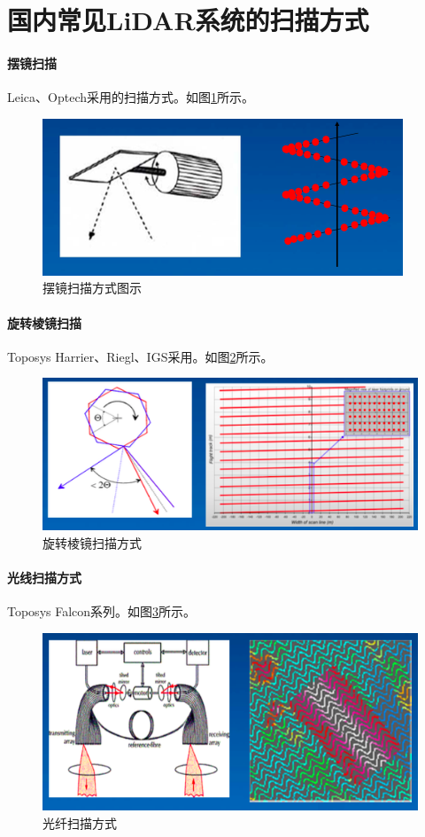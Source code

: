 \section{国内常见LiDAR系统的扫描方式}
\paragraph{摆镜扫描}Leica、Optech采用的扫描方式。如图\ref{fig:摆镜扫描方式}所示。
\begin{figure}[htbp]
	\centering
	\includegraphics[width=0.7\linewidth]{figure/Chapter1/摆镜扫描方式}
	\caption{摆镜扫描方式图示}
	\label{fig:摆镜扫描方式}
\end{figure}
\paragraph{旋转棱镜扫描}Toposys Harrier、Riegl、IGS采用。如图\ref{fig:旋转棱镜扫描方式}所示。
\begin{figure}[htbp]
	\centering
	\includegraphics[width=0.7\linewidth]{figure/Chapter1/旋转棱镜扫描方式}
	\caption{旋转棱镜扫描方式}
	\label{fig:旋转棱镜扫描方式}
\end{figure}
\paragraph{光线扫描方式}Toposys Falcon系列。如图\ref{fig:光纤扫描方式}所示。
\begin{figure}[htbp]
	\centering
	\includegraphics[width=0.7\linewidth]{figure/Chapter1/光纤扫描方式}
	\caption{光纤扫描方式}
	\label{fig:光纤扫描方式}
\end{figure}
